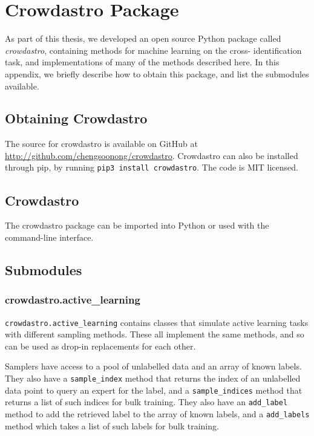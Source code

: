 
\appendix
\chapter{Crowdastro Package}
\label{cha:crowdastro}

As part of this thesis, we developed an open source Python package called
\emph{crowdastro}, containing methods for machine learning on the cross-%
identification task, and implementations of many of the methods described here.
In this appendix, we briefly describe how to obtain this package, and list the
submodules available.

\section{Obtaining Crowdastro}

    The source for crowdastro is available on GitHub at
    \url{http://github.com/chengsoonong/crowdastro}. Crowdastro can also be
    installed through pip, by running \texttt{pip3 install crowdastro}. The code
    is MIT licensed.

\section{Crowdastro}

    The crowdastro package can be imported into Python or used with the
    command-line interface.


\section{Submodules}
    \label{sec:crowdastro-submodules}

    \subsection{crowdastro.active\_learning}
    \label{sec:crowdastro-active-learning}

        \texttt{crowdastro.active\_learning} contains classes that simulate
        active learning tasks with different sampling methods. These all
        implement the same methods, and so can be used as drop-in replacements
        for each other.

        Samplers have access to a pool of unlabelled data and an array of known
        labels. They also have a \texttt{sample\_index} method that returns the
        index of an unlabelled data point to query an expert for the label, and
        a \texttt{sample\_indices} method that returns a list of such indices
        for bulk training. They also have an \texttt{add\_label} method to add
        the retrieved label to the array of known labels, and a
        \texttt{add\_labels} method which takes a list of such labels for bulk
        training.


